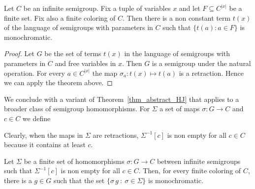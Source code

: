 \documentclass[creche.tex]{subfiles}
\begin{document}
\begin{HalesJewett}\label{thm_HalesJewett}
Let $C$ be an infinite semigroup.
Fix a tuple of variables $x$ and let $F\subseteq C^{|x|}$ be a finite set.
Fix also a finite coloring of $C$.
Then there is a non constant term $t(x)$ 
of the language of semigroups with parameters in $C$
such that $\{ t(a): a\in F\}$ is monochromatic.
\end{HalesJewett}

\begin{proof}
Let $G$ be the set of terms $t(x)$ in the language of semigroups 
with parameters in $C$ and free variables in $x$.
Then $G$ is a semigroup under the natural operation.
For every $a\in C^{|x|}$ the map $\sigma_a:t(x)\mapsto t(a)$ is a retraction.
Hence we can apply the theorem above.
\end{proof}

We conclude with a variant of Theorem~\ref{thm_abstract_HJ} that applies to a broader class of semigroup homomorphisms. For $\Sigma$ a set of maps $\sigma:G\to C$ and $c\in C$ we define 

\smallskip

Clearly, when the maps in $\Sigma$ are retractions, $\Sigma^{-1}[c]$ is non empty for all $c\in C$ because it contains at least $c$.

\begin{HalesJewett}\label{thm_hom_HJ}
Let $\Sigma$ be a finite set of homomorphisms $\sigma:G\to C$ 
between infinite semigroups
such that $\Sigma^{-1}[c]$ is non empty for all $c\in C$.
Then, for every finite coloring of $C$, there is a $g\in G$ such that the set 
$\{\sigma\,g\ :\ \sigma\in\Sigma\}$ is monochromatic.
\end{HalesJewett}
\end{document}
